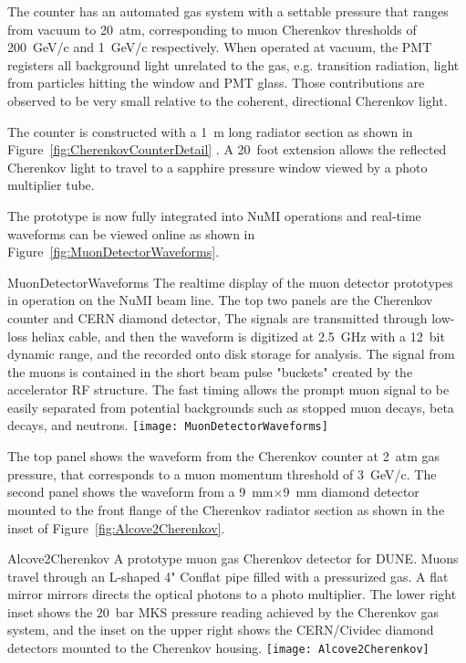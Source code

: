 The counter has an automated gas system with a settable pressure that
ranges from vacuum to 20~atm, corresponding to muon Cherenkov
thresholds of 200~GeV/c and 1~GeV/c respectively. When operated at
vacuum, the PMT registers all background light unrelated to the gas,
e.g. transition radiation, light from particles hitting the window and
PMT glass.  Those contributions are observed to be very small relative
to the coherent, directional Cherenkov light.

The counter is constructed with a 1~m long radiator section as shown
in Figure~\ref{fig:CherenkovCounterDetail} . A 20~foot extension
allows the reflected Cherenkov light to travel to a sapphire pressure
window viewed by a photo multiplier tube.

The prototype is now fully integrated into NuMI operations and
real-time waveforms can be viewed online as shown in
Figure~\ref{fig:MuonDetectorWaveforms}. 
\begin{cdrfigure}{MuonDetectorWaveforms}
{The realtime display of the muon detector prototypes in operation 
on the NuMI beam line. The top two panels are the Cherenkov counter 
and CERN diamond detector\cite{ref:CERNdiamond}, The signals are 
transmitted through low-loss heliax cable, and then the waveform 
is digitized at 2.5~GHz with a 12~bit dynamic range, and the 
recorded onto disk storage for analysis. The signal from the 
muons is contained in the short beam pulse "buckets" created 
by the accelerator RF structure. The fast timing allows the 
prompt muon signal to be easily separated from potential backgrounds 
such as stopped muon decays, beta decays, and neutrons.}
\texttt{[image: MuonDetectorWaveforms]}
\end{cdrfigure}
The top panel shows the waveform from the Cherenkov counter at 2~atm
gas pressure, that corresponds to a muon momentum threshold of
3~GeV/c. The second panel shows the waveform from a 9~mm$\times$9~mm
diamond detector mounted to the front flange of the Cherenkov radiator
section as shown in the inset of Figure~\ref{fig:Alcove2Cherenkov}.
\begin{cdrfigure}{Alcove2Cherenkov}
{A prototype muon gas Cherenkov detector for DUNE.  
Muons travel through an L-shaped 4" Conflat pipe filled with a 
pressurized gas. A flat mirror mirrors directs the optical photons 
to a photo multiplier. The lower right inset shows the 20~bar MKS 
pressure reading achieved by the Cherenkov gas system, and the inset 
on the upper right shows the CERN/Cividec diamond detectors mounted to the Cherenkov housing.}
\texttt{[image: Alcove2Cherenkov]}
\end{cdrfigure}


